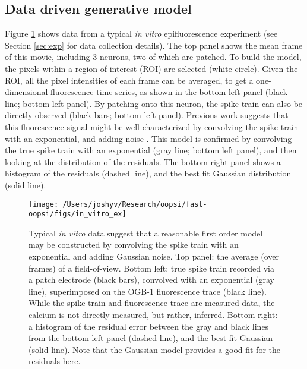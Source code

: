 \subsection{Data driven generative model} \label{sec:model}

Figure \ref{fig:in_vitro_ex} shows data from a typical \emph{in vitro} epifluorescence experiment (see Section \ref{sec:exp} for data collection details).  The top panel shows the mean frame of this movie, including 3 neurons, two of which are patched.  To build the model, the pixels within a region-of-interest (ROI) are selected (white circle).  Given the ROI, all the pixel intensities of each frame can be averaged, to get a one-dimensional fluorescence time-series, as shown in the bottom left panel (black line; bottom left panel).  By patching onto this neuron, the spike train can also be directly observed (black bars; bottom left panel). Previous work suggests that this fluorescence signal might be well characterized by convolving the spike train with an exponential, and adding noise \cite{ImagingManual}.  This model is confirmed by convolving the true spike train with an exponential (gray line; bottom left panel), and then looking at the distribution of the residuals.  The bottom right panel shows a histogram of the residuals (dashed line), and the best fit Gaussian distribution (solid line).


\begin{figure}[h!]
\centering \texttt{[image: /Users/joshyv/Research/oopsi/fast-oopsi/figs/in\_vitro\_ex]}
\caption[data-based model]{Typical \emph{in vitro} data suggest that a reasonable first order model may be constructed by convolving the spike train with an exponential and adding Gaussian noise. Top panel: the average (over frames) of a  field-of-view.  Bottom left: true spike train recorded via a patch electrode (black bars), convolved with an exponential (gray line), superimposed on the OGB-1 fluorescence trace (black line).  While the spike train and fluorescence trace are measured data, the calcium is not directly measured, but rather, inferred.  Bottom right: a histogram of the residual error between the gray and black lines from the bottom left panel (dashed line), and the best fit Gaussian (solid line). Note that the Gaussian model provides a good fit for the residuals here.} \label{fig:in_vitro_ex}
\end{figure}

